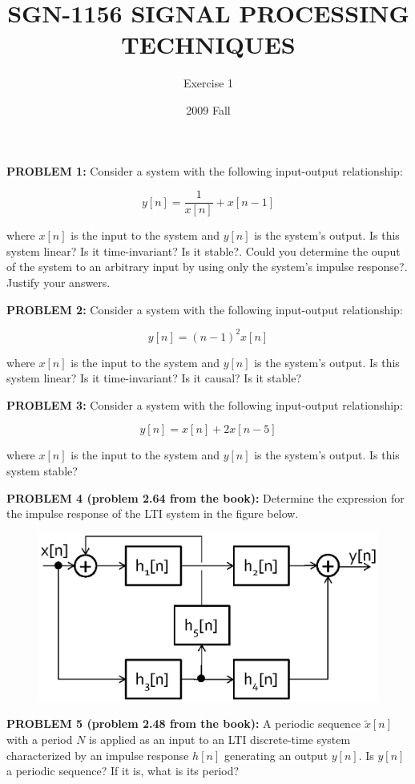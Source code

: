 \documentclass[11pt]{article}
\title{\large{\textbf{SGN-1156 SIGNAL PROCESSING TECHNIQUES}}}
\author{Exercise 1}
\date{2009 Fall}
\begin{document}
\maketitle


\textbf{PROBLEM 1:}  Consider a system with the following input-output relationship:

\[
y[n] = \frac{1}{x[n]}+x[n-1]
\]

where $x[n]$ is the input to the system and $y[n]$ is the system's output. Is this system linear? Is it time-invariant? Is it stable?. Could you determine the ouput of the system to an arbitrary input by using only the system's impulse response?. Justify your answers. 

\vspace{1cm}



\textbf{PROBLEM 2:} Consider a system with the following input-output relationship:

\[
y[n] = (n-1)^2 x[n]
\]

where $x[n]$ is the input to the system and $y[n]$ is the system's output. Is this system linear? Is it time-invariant? Is it causal? Is it stable?

\vspace{1cm}




\textbf{PROBLEM 3:} Consider a system with the following input-output relationship:

\[
y[n] = x[n]+2x[n-5]
\]

where $x[n]$ is the input to the system and $y[n]$ is the system's output. Is this system stable?

\vspace{1cm}



\textbf{PROBLEM 4 (problem 2.64 from the book):}  Determine the expression for the impulse response of the LTI system in the figure below.


\begin{figure}[h!]
	\centering
		\includegraphics[width=.75\textwidth]{./system.eps}
\end{figure}



\vspace{1cm}

\textbf{PROBLEM 5 (problem 2.48 from the book):} A periodic sequence $\tilde{x}[n]$ with a period $N$ is applied as an input to an LTI discrete-time system characterized by an impulse response $h[n]$ generating an output $y[n]$. Is $y[n]$ a periodic sequence? If it is, what is its period?
\end{document}
